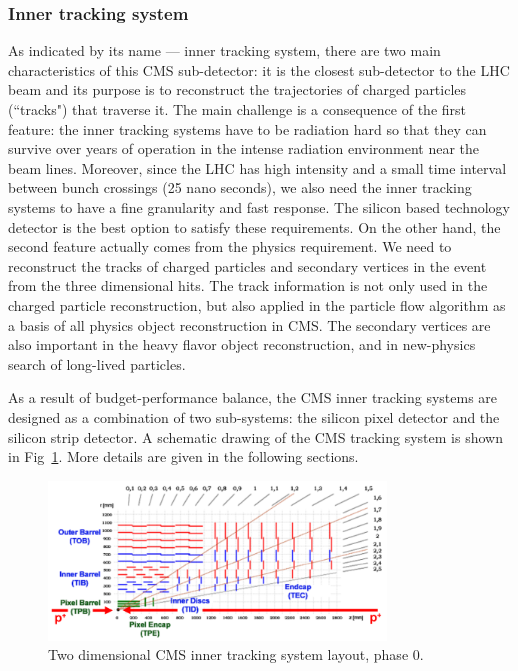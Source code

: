 \subsubsection{Inner tracking system}

As indicated by its name --- inner tracking system, there are two main characteristics of this CMS sub-detector: it is the closest sub-detector to the LHC beam and its purpose is to reconstruct the trajectories of charged particles (``tracks") that traverse it. The main challenge is a consequence of the first feature: the inner tracking systems have to be radiation hard so that they can survive over years of operation in the intense radiation environment near the beam lines. Moreover, since the LHC has high intensity and a small time interval between bunch crossings (25 nano seconds), we also need the inner tracking systems to have a fine granularity and fast response. The silicon based technology detector is the best option to satisfy these requirements. On the other hand, the second feature actually comes from the physics requirement. We need to reconstruct the tracks of charged particles and secondary vertices in the event from the three dimensional hits. The track information is not only used in the charged particle reconstruction, but also applied in the particle flow algorithm\cite{CMS-PAS-PFT-09-001} as a basis of all physics object reconstruction in CMS. The secondary vertices are also important in the heavy flavor object reconstruction, and in new-physics search of long-lived particles. 

As a result of budget-performance balance, the CMS inner tracking systems are designed as a combination of two sub-systems: the silicon pixel detector and the silicon strip detector. A schematic drawing of the CMS tracking system is shown in Fig~\ref{fig:c3cms2dtracker}. More details are given in the following sections. 

\begin{figure}[htbp]
 \begin{center}
  \includegraphics[width=0.8\textwidth]{figures/c3/c3_cms_2dtracker.png}
 \end{center}
 \caption{Two dimensional CMS inner tracking system layout, phase 0.}
 \label{fig:c3cms2dtracker}
\end{figure}

